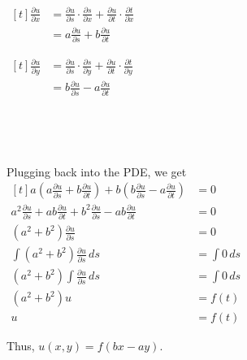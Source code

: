 \documentclass[11pt,fleqn]{book} %
\begin{document}
\begin{enumerate}
    {~~~}

    {~~~}
    
    \begin{minipage}[t]{0.45\linewidth}
        $\begin{aligned}[t]
            \frac{\partial u}{\partial x}
             & = \frac{\partial u}{\partial s} \cdot \frac{\partial s}{\partial x} + \frac{\partial u}{\partial t} \cdot \frac{\partial t}{\partial x} \\
             & = a \frac{\partial u}{\partial s} + b \frac{\partial u}{\partial t}
        \end{aligned}$
    \end{minipage}
    \begin{minipage}[t]{0.45\linewidth}
        $\begin{aligned}[t]
            \frac{\partial u}{\partial y}
             & = \frac{\partial u}{\partial s} \cdot \frac{\partial s}{\partial y} + \frac{\partial u}{\partial t} \cdot \frac{\partial t}{\partial y} \\
             & = b \frac{\partial u}{\partial s} - a \frac{\partial u}{\partial t}
        \end{aligned}$
    \end{minipage}

    {~~~}

    {~~~}

    Plugging back into the PDE, we get $\begin{aligned}[t]
        a \left( a \frac{\partial u}{\partial s} + b \frac{\partial u}{\partial t} \right) + b \left( b \frac{\partial u}{\partial s} - a \frac{\partial u}{\partial t} \right) & = 0 \\
        a^2 \frac{\partial u}{\partial s} + ab \frac{\partial u}{\partial t} + b^2 \frac{\partial u}{\partial s} - ab \frac{\partial u}{\partial t} & = 0 \\
        (a^2 + b^2) \frac{\partial u}{\partial s}           & = 0           \\
        \int (a^2 + b^2) \frac{\partial u}{\partial s} \,ds & = \int 0 \,ds \\
        (a^2 + b^2) \int \frac{\partial u}{\partial s} \,ds & = \int 0 \,ds \\
        (a^2 + b^2) u                                       & = f(t)        \\
        u                                                   & = f(t)
    \end{aligned}$

    Thus, $u(x, y) = f(bx - ay)$. 
    

\end{enumerate}
\end{document}
